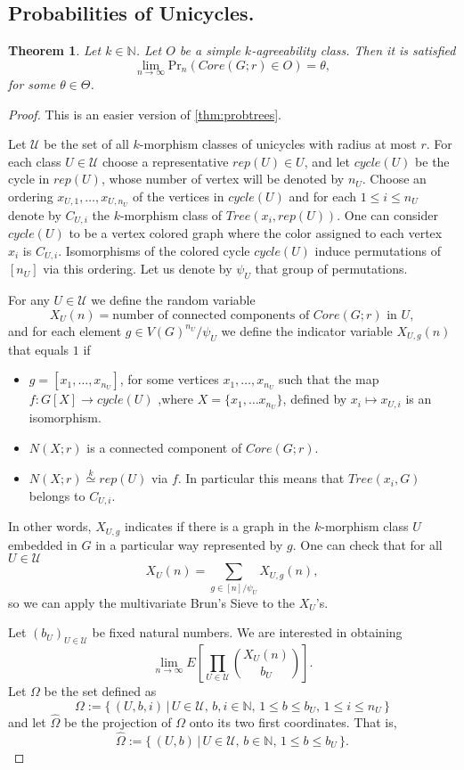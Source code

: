\documentclass[11pt,notitlepage,a4paper]{article}
\newtheorem{theorem}{Theorem}[section]
\theoremstyle{definition}
\newcommand{\N}{\mathbb{N}}
\newcommand{\Ln}{\lim\limits_{n\to \infty}}
\newcommand{\morph}[1]{\stackrel{#1}{\simeq}}
\begin{document}
\subsection{Probabilities of Unicycles.}

\begin{theorem} \label{thm:probcycles}
	Let $k\in \N$.
	Let $O$ be a simple $k$-agreeability class. Then it is satisfied
	\[ \Ln \mathrm{Pr}_n(Core(G;r)\in O) = \theta, \]
	for some $\theta\in \Theta$.
\end{theorem}

\begin{proof}
	This is an easier version of \cref{thm:probtrees}.\par
	Let $\mathcal{U}$ be the set of all $k$-morphism classes of 
	unicycles with radius at most $r$. 
	For each class $U\in \mathcal{U}$ choose a representative $rep(U)\in U$, 
	and let  $cycle(U)$ be the cycle in $rep(U)$, whose number of vertex will be
	denoted by $n_U$. Choose an ordering $x_{U,1},\dots, x_{U,n_U}$
	of the vertices in $cycle(U)$ and for each $1\leq i \leq n_{U}$ 
	denote by $C_{U,i}$ the $k$-morphism class
	of $Tree(x_i,rep(U))$. One can consider $cycle(U)$ to be a 
	vertex colored graph where the color assigned to each vertex $x_i$
    is $C_{U,i}$. Isomorphisms of the colored cycle 
	$cycle(U)$ induce permutations of $[n_U]$ via this ordering. 
	Let us denote by $\psi_U$ that group of permutations.\par 
	For any $U\in \mathcal{U}$ we define the random variable 
	\[X_{U}(n)=\text{number of connected components of }Core(G;r) 
	\text{ in } U ,\]
	and for each element $g\in V(G)^{n_U}/\psi_U$ 
	we define the indicator variable $X_{U,g}(n)$ that equals $1$ if 
	\begin{itemize}
		\item $g=[x_1,\dots, x_{n_U}]$, for some vertices
		$x_1,\dots, x_{n_U}$ such that the map $f:G[X]\rightarrow cycle(U)$ 
		,where $X=\{x_1,\dots x_{n_U}\}$, defined by $x_i\mapsto x_{U,i}$ is an
		isomorphism. 
		\item $N(X;r)$ is a connected component of $Core(G;r)$.
		\item $N(X;r)\morph{k} rep(U)$ via $f$. In particular this means
		that $Tree(x_i, G)$ belongs to $C_{U,i}$.
	\end{itemize}	
	In other words, $X_{U,g}$ indicates if there is a graph in the $k$-morphism
	class $U$ embedded in $G$ in a particular way represented by $g$.
	One can check that for all $U\in \mathcal{U}$
	\[ X_U(n)=\sum_{g\in [n]/\psi_U} X_{U,g}(n),  \]
	so we can apply the multivariate Brun's Sieve to the $X_U$'s.\par
	Let $(b_U)_{U\in \mathcal{U}}$ be fixed natural numbers. We are interested
	in obtaining
	\[\Ln E\left[\prod_{U\in \mathcal{U}}
	\binom{X_{U}(n)}{b_{U}}\right].\]
	Let $\Omega$ be the set defined as
	\[ \Omega:= \{\, (U,b,i) \, | \, U\in \mathcal{U}, 
	\, b,i\in \N, \, 1\leq b \leq b_U,  \, 1\leq i \leq n_U\,  \}\]
	and let $\widehat{\Omega}$ be the projection of $\Omega$ onto its
	two first coordinates. That is, 
	\[\widehat{\Omega}:=\{\, (U,b) \, | \, U\in \mathcal{U}, 
	\, b\in \N, \, 1\leq b \leq b_U \, \}. \] 


\end{proof}
\end{document}
